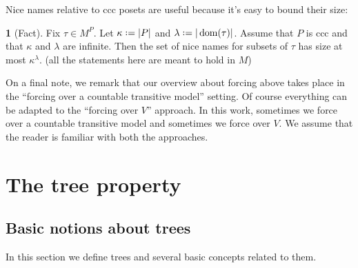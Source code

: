\documentclass[11pt,a4paper]{report}
\theoremstyle{definition}
\theoremstyle{num.custom-title}
\theoremstyle{custom-title}
\newtheorem*{teo_custom-title_nonum}{}
\DeclareMathOperator{\dom}{dom}
\newcommand*{\defeq}{\mathrel{\rlap{%
                     \raisebox{0.3ex}{$\cdot$}}%
                     \raisebox{-0.3ex}{$\cdot$}}%
                     =}
\begin{document}
Nice names relative to ccc posets are useful because it's easy to bound their size:

\begin{teo_custom-title_nonum}[Fact]\label{lemma-counting_nice_names}
Fix $\tau \in M^P$. Let $\kappa \defeq |P|$ and $\lambda \defeq |\dom(\tau)|$. Assume that $P$ is ccc and that $\kappa$ and $\lambda$ are infinite. Then the set of nice names for subsets of $\tau$ has size at most $\kappa^\lambda$. (all the statements here are meant to hold in $M$)
\end{teo_custom-title_nonum}

On a final note, we remark that our overview about forcing above takes place in the ``forcing over a countable transitive model'' setting. Of course everything can be adapted to the ``forcing over $V$'' approach. In this work, sometimes we force over a countable transitive model and sometimes we force over $V$. We assume that the reader is familiar with both the approaches.




\newpage\null\thispagestyle{empty}\newpage




\chapter{The tree property}

\section{Basic notions about trees}


In this section we define trees and several basic concepts related to them.
\end{document}
